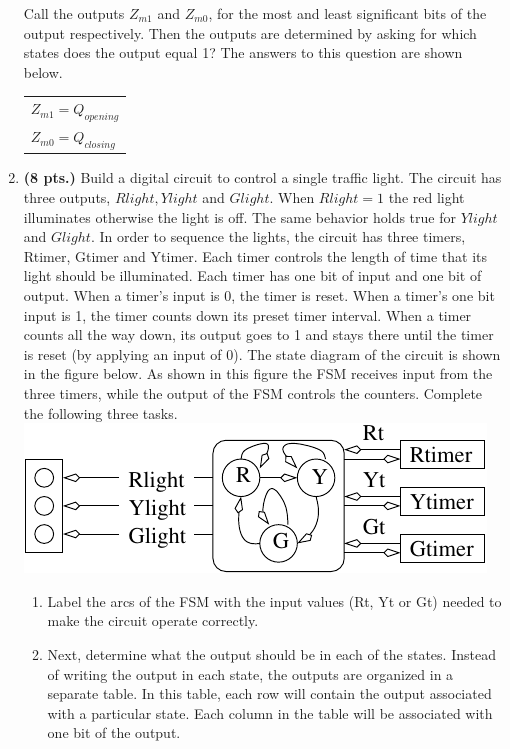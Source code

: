 \begin{enumerate}
\begin{onlysolution}
{Call the outputs $Z_{m1}$ and $Z_{m0}$, for the most and least
significant bits of the output respectively.  Then the outputs
are determined by asking for which states does the output
equal 1?  The answers to this question are shown below.

\begin{tabular}{l}
$Z_{m1} = Q_{opening}$ \\
$Z_{m0} = Q_{closing}$ \\
\end{tabular}

}\end{onlysolution} 


\item \textbf{ (8 pts.)}
Build a digital circuit to control a single traffic light.  The circuit
has three outputs, $Rlight, Ylight$ and $ Glight$.  When
$Rlight=1$ the red light illuminates otherwise the light is off.
The same behavior holds true for $Ylight$ and $Glight$.  In order
to sequence the lights, the circuit has three timers, Rtimer, Gtimer and 
Ytimer.  Each timer controls the length of time that its light should be 
illuminated.  Each timer has one bit of input and one bit of output.  When a 
timer's input is 0, the timer is reset.  When a timer's one bit
input is 1, the timer 
counts down its preset timer interval.  When a timer counts all the way down,
its output goes to 1 and stays there until the timer is reset (by applying
an input of 0).  The state diagram of the circuit is shown in the
figure below.  As shown in this figure the FSM receives input from the 
three timers, while the output of the FSM controls the counters. Complete
the following three tasks.
\includegraphics{./FigWork/Light}

\begin{enumerate}
\item Label the arcs of the FSM with the input values (Rt, Yt or Gt)
needed to make the circuit operate correctly.  

\item Next, determine what the output should be in each
of the states.  Instead of writing the output in each state, the
outputs are organized in a separate table.  In this table, each
row will contain the output associated with a particular state.
Each column in the table will be associated with one bit of the output.


\end{enumerate}
\end{enumerate}
